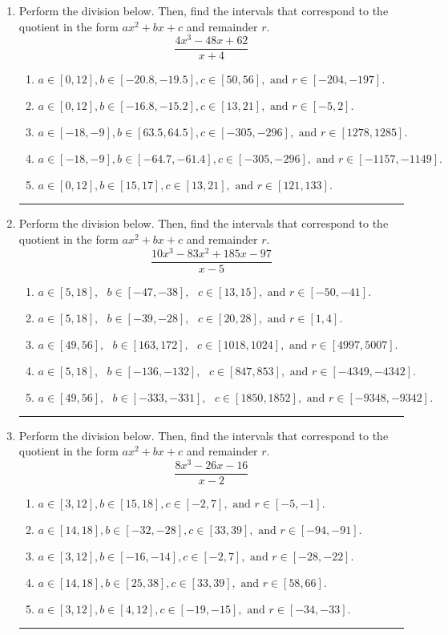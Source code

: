 \documentclass[14pt]{extbook}
\newcommand{\litem}[1]{\item#1\hspace*{-1cm}\rule{\textwidth}{0.4pt}}
\begin{document}
\begin{enumerate}
{\begin{enumerate}[label=\Alph*.]
\end{enumerate} }
\litem{
Perform the division below. Then, find the intervals that correspond to the quotient in the form $ax^2+bx+c$ and remainder $r$.\[ \frac{4x^{3} -48 x + 62}{x + 4} \]\begin{enumerate}[label=\Alph*.]
\item \( a \in [0, 12], b \in [-20.8, -19.5], c \in [50, 56], \text{ and } r \in [-204, -197]. \)
\item \( a \in [0, 12], b \in [-16.8, -15.2], c \in [13, 21], \text{ and } r \in [-5, 2]. \)
\item \( a \in [-18, -9], b \in [63.5, 64.5], c \in [-305, -296], \text{ and } r \in [1278, 1285]. \)
\item \( a \in [-18, -9], b \in [-64.7, -61.4], c \in [-305, -296], \text{ and } r \in [-1157, -1149]. \)
\item \( a \in [0, 12], b \in [15, 17], c \in [13, 21], \text{ and } r \in [121, 133]. \)

\end{enumerate} }
\litem{
Perform the division below. Then, find the intervals that correspond to the quotient in the form $ax^2+bx+c$ and remainder $r$.\[ \frac{10x^{3} -83 x^{2} +185 x -97}{x -5} \]\begin{enumerate}[label=\Alph*.]
\item \( a \in [5, 18], \text{   } b \in [-47, -38], \text{   } c \in [13, 15], \text{   and   } r \in [-50, -41]. \)
\item \( a \in [5, 18], \text{   } b \in [-39, -28], \text{   } c \in [20, 28], \text{   and   } r \in [1, 4]. \)
\item \( a \in [49, 56], \text{   } b \in [163, 172], \text{   } c \in [1018, 1024], \text{   and   } r \in [4997, 5007]. \)
\item \( a \in [5, 18], \text{   } b \in [-136, -132], \text{   } c \in [847, 853], \text{   and   } r \in [-4349, -4342]. \)
\item \( a \in [49, 56], \text{   } b \in [-333, -331], \text{   } c \in [1850, 1852], \text{   and   } r \in [-9348, -9342]. \)

\end{enumerate} }
\litem{
Perform the division below. Then, find the intervals that correspond to the quotient in the form $ax^2+bx+c$ and remainder $r$.\[ \frac{8x^{3} -26 x -16}{x -2} \]\begin{enumerate}[label=\Alph*.]
\item \( a \in [3, 12], b \in [15, 18], c \in [-2, 7], \text{ and } r \in [-5, -1]. \)
\item \( a \in [14, 18], b \in [-32, -28], c \in [33, 39], \text{ and } r \in [-94, -91]. \)
\item \( a \in [3, 12], b \in [-16, -14], c \in [-2, 7], \text{ and } r \in [-28, -22]. \)
\item \( a \in [14, 18], b \in [25, 38], c \in [33, 39], \text{ and } r \in [58, 66]. \)
\item \( a \in [3, 12], b \in [4, 12], c \in [-19, -15], \text{ and } r \in [-34, -33]. \)


\end{enumerate}}
\end{enumerate}
\end{document}
